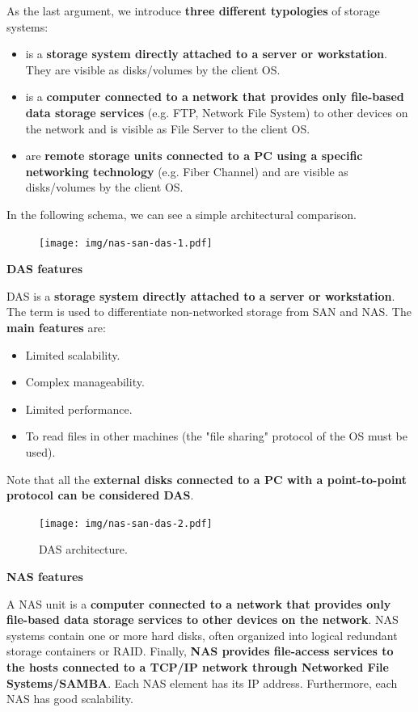 As the last argument, we introduce \textbf{three different typologies} of storage systems:
\begin{itemize}
	\item {} is a \textbf{storage system directly attached to a server or workstation}. They are visible as disks/volumes by the client OS.
	
	\item {} is a \textbf{computer connected to a network that provides only file-based data storage services} (e.g. FTP, Network File System) to other devices on the network and is visible as File Server to the client OS.
	
	\item {} are \textbf{remote storage units connected to a PC using a specific networking technology} (e.g. Fiber Channel) and are visible as disks/volumes by the client OS.
\end{itemize}
In the following schema, we can see a simple architectural comparison.
\begin{figure}[!htp]
	\centering
	\texttt{[image: img/nas-san-das-1.pdf]}
\end{figure}

\begin{flushleft}
	\textcolor{Red2}{ \textbf{DAS features}}
\end{flushleft}
DAS is a \textbf{storage system directly attached to a server or workstation}. The term is used to differentiate non-networked storage from SAN and NAS. The \textbf{main features} are:
\begin{itemize}
	\item Limited scalability.
	\item Complex manageability.
	\item Limited performance.
	\item To read files in other machines (the "file sharing" protocol of the OS must be used).
\end{itemize}
Note that all the \textbf{external disks connected to a PC with a point-to-point protocol can be considered DAS}.
\begin{figure}[!htp]
	\centering
	\texttt{[image: img/nas-san-das-2.pdf]}
	\caption{DAS architecture.}
\end{figure}

\highspace
\begin{flushleft}
	\textcolor{Red2}{ \textbf{NAS features}}
\end{flushleft}
A NAS unit is a \textbf{computer connected to a network that provides only file-based data storage services to other devices on the network}. NAS systems contain one or more hard disks, often organized into logical redundant storage containers or RAID. Finally, \textbf{NAS provides file-access services to the hosts connected to a TCP/IP network through Networked File Systems/SAMBA}. Each NAS element has its IP address. Furthermore, each NAS has good scalability.

